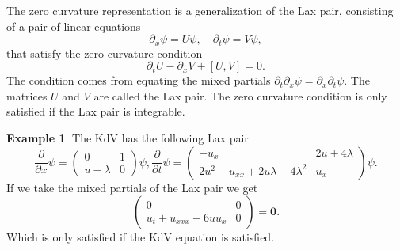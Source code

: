 \documentclass[english,master]{liumaiex}
\theoremstyle{plain}
\theoremstyle{definition}
\newtheorem{example}[proposition]{Example}
\begin{document}
The zero curvature representation is a generalization of the Lax pair, consisting of a pair of linear equations
\begin{equation}
	\partial_x \psi = U \psi, \quad \partial_t \psi = V \psi,
\end{equation}
that satisfy the zero curvature condition
\begin{equation}
	\partial_t U - \partial_x V + [U, V] = 0.
\end{equation}
The condition comes from equating the mixed partials $\partial_t \partial_x \psi = \partial_x \partial_t \psi$. The matrices $U$ and $V$ are called the Lax pair. The zero curvature condition is only satisfied if the Lax pair is integrable. 
\begin{example}
The KdV has the following Lax pair
\begin{subequations}
  \begin{equation}
    \frac{\partial}{\partial x} \psi =
    \begin{pmatrix}
      0 & 1 \\
      u - \lambda & 0
    \end{pmatrix}
	\psi,
  \end{equation}
  \begin{equation}
    \frac{\partial}{\partial t} \psi =
    \begin{pmatrix}
      -u_x & 2u + 4\lambda \\
      2u^2 - u_{xx} + 2u\lambda - 4\lambda^2 & u_x
    \end{pmatrix}
    \psi.
  \end{equation}
\end{subequations}
If we take the mixed partials of the Lax pair we get
\begin{equation}
	\begin{pmatrix}
	0 & 0\\
	u_t + u_{xxx} - 6u u_x & 0
	\end{pmatrix} =
	\mathbf{\bar{0}}.
\end{equation}
Which is only satisfied if the KdV equation is satisfied.
\end{example}
\end{document}
